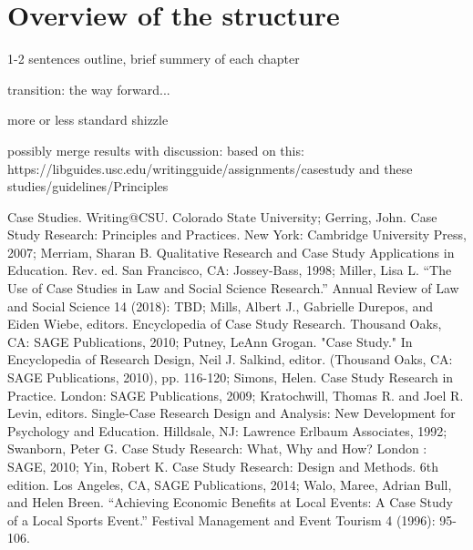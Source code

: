 {\section{Overview of the structure}
1-2 sentences outline, brief summery of each chapter

transition: the way forward...




more or less standard shizzle

possibly merge results with discussion: based on this: https://libguides.usc.edu/writingguide/assignments/casestudy and these studies/guidelines/Principles

Case Studies. Writing@CSU. Colorado State University; Gerring, John. Case Study Research: Principles and Practices. New York: Cambridge University Press, 2007; Merriam, Sharan B. Qualitative Research and Case Study Applications in Education. Rev. ed. San Francisco, CA: Jossey-Bass, 1998; Miller, Lisa L. “The Use of Case Studies in Law and Social Science Research.” Annual Review of Law and Social Science 14 (2018): TBD; Mills, Albert J., Gabrielle Durepos, and Eiden Wiebe, editors. Encyclopedia of Case Study Research. Thousand Oaks, CA: SAGE Publications, 2010; Putney, LeAnn Grogan. "Case Study." In Encyclopedia of Research Design, Neil J. Salkind, editor. (Thousand Oaks, CA: SAGE Publications, 2010), pp. 116-120; Simons, Helen. Case Study Research in Practice. London: SAGE Publications, 2009; Kratochwill, Thomas R. and Joel R. Levin, editors. Single-Case Research Design and Analysis: New Development for Psychology and Education. Hilldsale, NJ: Lawrence Erlbaum Associates, 1992; Swanborn, Peter G. Case Study Research: What, Why and How? London : SAGE, 2010; Yin, Robert K. Case Study Research: Design and Methods. 6th edition. Los Angeles, CA, SAGE Publications, 2014; Walo, Maree, Adrian Bull, and Helen Breen. “Achieving Economic Benefits at Local Events: A Case Study of a Local Sports Event.” Festival Management and Event Tourism 4 (1996): 95-106.




}
